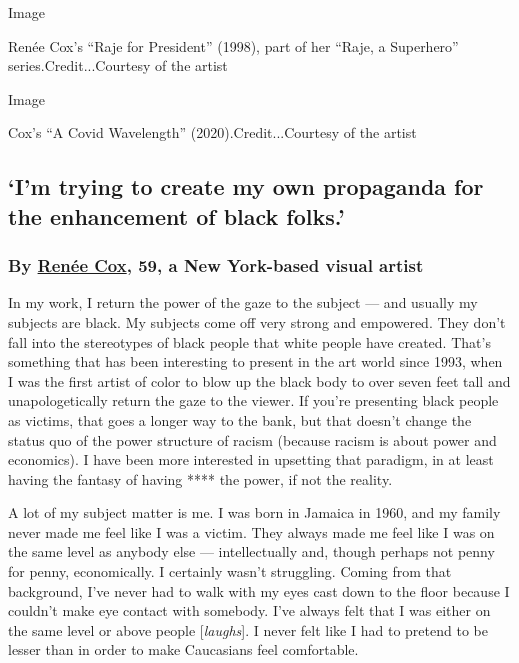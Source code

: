 Image

Renée Cox's ``Raje for President'' (1998), part of her ``Raje, a
Superhero'' series.Credit...Courtesy of the artist

Image

Cox's ``A Covid Wavelength'' (2020).Credit...Courtesy of the artist

\hypertarget{im-trying-to-create-my-own-propaganda-for-the-enhancement-of-black-folks}{%
\subsection{`I'm trying to create my own propaganda for the enhancement
of black
folks.'}\label{im-trying-to-create-my-own-propaganda-for-the-enhancement-of-black-folks}}

\hypertarget{by-renuxe9e-cox-59-a-new-york-based-visual-artist}{%
\subsubsection{\texorpdfstring{\textbf{By}
\textbf{\href{https://www.reneecox.org/}{Renée Cox}, 59, a New
York-based visual
artist}}{By Renée Cox, 59, a New York-based visual artist}}\label{by-renuxe9e-cox-59-a-new-york-based-visual-artist}}

In my work, I return the power of the gaze to the subject --- and
usually my subjects are black. My subjects come off very strong and
empowered. They don't fall into the stereotypes of black people that
white people have created. That's something that has been interesting to
present in the art world since 1993, when I was the first artist of
color to blow up the black body to over seven feet tall and
unapologetically return the gaze to the viewer. If you're presenting
black people as victims, that goes a longer way to the bank, but that
doesn't change the status quo of the power structure of racism (because
racism is about power and economics). I have been more interested in
upsetting that paradigm, in at least having the fantasy of having ****
the power, if not the reality.

A lot of my subject matter is me. I was born in Jamaica in 1960, and my
family never made me feel like I was a victim. They always made me feel
like I was on the same level as anybody else --- intellectually and,
though perhaps not penny for penny, economically. I certainly wasn't
struggling. Coming from that background, I've never had to walk with my
eyes cast down to the floor because I couldn't make eye contact with
somebody. I've always felt that I was either on the same level or above
people {[}\emph{laughs}{]}. I never felt like I had to pretend to be
lesser than in order to make Caucasians feel comfortable.


